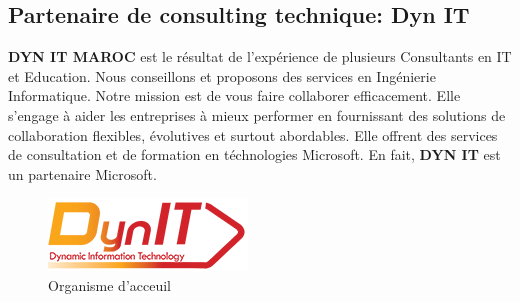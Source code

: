 \documentclass[a4paper]{report}
\begin{document}
\begin{doublespace}
    \subsection{Partenaire de consulting technique: Dyn IT}
    \textbf{DYN IT MAROC} est le résultat de l’expérience de plusieurs Consultants en IT et Education.
    Nous conseillons et proposons des services en Ingénierie Informatique. Notre mission est de
    vous faire collaborer efficacement. Elle s'engage à aider les entreprises à mieux performer
    en fournissant des solutions de collaboration flexibles, évolutives et surtout abordables.
    Elle offrent des services de consultation et de formation en téchnologies Microsoft. En fait,
    \textbf{DYN IT} est un partenaire Microsoft.
    \begin{figure}[H]
        \begin{center}
            \includegraphics[scale=0.6]{images/dynit.png}
            \caption{Organisme d'acceuil}
        \end{center}
    \end{figure}

\end{doublespace}
\end{document}
